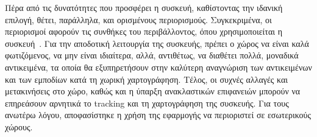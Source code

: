 Πέρα από τις δυνατότητες που προσφέρει η συσκευή, καθίστοντας την ιδανική επιλογή, θέτει, παράλληλα, και ορισμένους περιορισμούς. Συγκεκριμένα, οι περιορισμοί αφορούν τις συνθήκες του περιβάλλοντος, όπου χρησιμοποιείται η συσκευή~\cite{dorreneb_2022_hololens}. 
Για την αποδοτική λειτουργία της συσκευής, πρέπει ο χώρος να είναι καλά φωτιζόμενος, να μην είναι ιδιαίτερα, αλλά, αντιθέτως, να διαθέτει πολλά, μοναδικά αντικειμένα, τα οποία θα εξυπηρετήσουν στην καλύτερη αναγνώριση των αντικειμένων και των εμποδίων κατά τη χωρική χαρτογράφηση. Τέλος, οι συχνές αλλαγές και μετακινήσεις στο χώρο, καθώς και η ύπαρξη ανακλαστικών επιφανειών μπορούν να επηρεάσουν αρνητικά το tracking και τη χαρτογράφηση της συσκευής.
Για τους ανωτέρω λόγου, αποφασίστηκε η χρήση της εφαρμογής να περιοριστεί σε εσωτερικούς χώρους.

